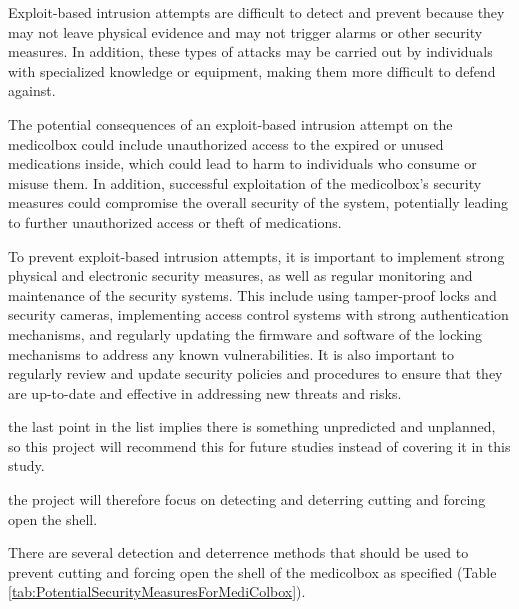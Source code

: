 \documentclass[../main.tex]{subfiles}
\begin{document}
Exploit-based \gls{intrusion} attempts are difficult to detect and prevent
because they may not leave physical evidence and may not
trigger alarms or other security measures.
In addition, these types of attacks may be carried out by individuals
with specialized knowledge or equipment,
making them more difficult to defend against.

The potential consequences of an exploit-based \gls{intrusion}
attempt on the \gls{medicolbox} could include unauthorized access to
the expired or unused medications inside,
which could lead to harm to individuals who consume or misuse them.
In addition, successful exploitation of
the \gls{medicolbox}'s security measures could compromise the
overall security of the system,
potentially leading to further unauthorized access
or theft of medications.

To prevent exploit-based \gls{intrusion} attempts,
it is important to implement strong physical
and electronic security measures,
as well as regular monitoring and maintenance of the security systems.
This include using tamper-proof locks and security cameras,
implementing access control systems with strong authentication mechanisms,
and regularly updating the firmware and software of
the locking mechanisms to address any known vulnerabilities.
It is also important to regularly review and update
security policies and procedures to ensure that
they are up-to-date and effective in addressing new threats and risks.

the last point in the list implies there is something
unpredicted and unplanned, so this project will
recommend this for future studies
instead of covering it in this study.

the project will therefore focus on detecting
and deterring cutting and forcing open the shell.

There are several detection and deterrence methods
that should be used to prevent cutting and forcing open the shell of
the \gls{medicolbox} as specified (Table \ref{tab:PotentialSecurityMeasuresForMediColbox}).
\end{document}
